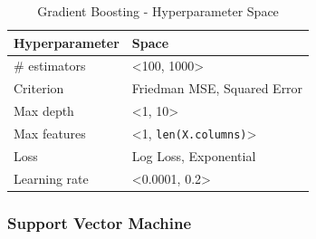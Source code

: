         \begin{table}[H]
            \small
            \setlength{\tabcolsep}{8pt}
            \renewcommand{\arraystretch}{1.3}
            \centering
                \caption[Gradient Boosting - Hyperparameter Space]{Gradient Boosting - Hyperparameter Space}\label{tab:gbspace}
                \begin{tabular}{ll}
            \toprule
            \textbf{Hyperparameter} & \textbf{Space}\\
            \midrule
            \hline
            \# estimators & <100, 1000> \\
            Criterion & Friedman MSE, Squared Error \\
            Max depth & <1, 10> \\
            Max features & <1, \verb|len(X.columns)|>  \\
            Loss & Log Loss, Exponential \\
            Learning rate & <0.0001, 0.2> \\
            \hline
            \bottomrule
            \end{tabular}
            \vspace{0.7em}
        
            \vspace{-1em}
        \end{table}
        
        \subsubsection{Support Vector Machine}
        
